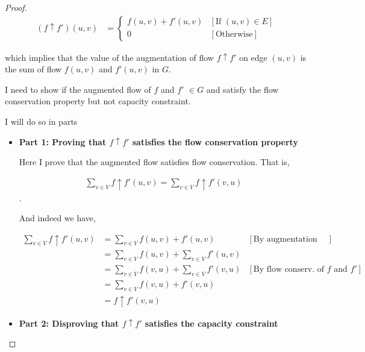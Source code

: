 \documentclass[12pt]{article}
\begin{document}
\begin{enumerate}[1.]
\begin{proof}
    \begin{align}
        (f \uparrow f')(u,v) &= \begin{cases}
            f(u,v) + f'(u,v) & [\text{If $(u,v) \in E$}]\\
            0 & [\text{Otherwise}]
        \end{cases}
    \end{align}

    which implies that the value of the augmentation of flow $f \uparrow f'$
    on edge $(u,v)$ is the sum of flow $f(u,v)$ and $f'(u,v)$ in $G$.

    \bigskip

    I need to show if the augmented flow of $f$ and $f'$ $\in G$ and satisfy the
    flow conservation property but not capacity constraint.

    \bigskip

    I will do so in parts

    \begin{itemize}
        \item \textbf{Part 1: Proving that $f \uparrow f'$ satisfies the flow conservation property}

        \bigskip

        Here I prove that the augmented flow satisfies flow conservation. That is,

        \begin{align}
        \sum\limits_{v \in V} f \uparrow f' (u,v) = \sum\limits_{v \in V} f \uparrow f' (v,u)
        \end{align}.

        \bigskip

        And indeed we have,

        \begin{align}
            \sum\limits_{v \in V} f \uparrow f' (u,v) &= \sum\limits_{v \in V} f(u,v) + f'(u,v) & [\text{By augmentation def.}]\\
            &= \sum\limits_{v \in V} f(u,v) + \sum\limits_{v \in V} f'(u,v)\\
            &= \sum\limits_{v \in V} f(v,u) + \sum\limits_{v \in V} f'(v,u) & [\text{By flow conserv. of $f$ and $f'$}]\\
            &= \sum\limits_{v \in V} f(v,u) + f'(v,u)\\
            &= f \uparrow f' (v,u)
        \end{align}

        \bigskip

        \item \textbf{Part 2: Disproving that $f \uparrow f'$ satisfies the capacity constraint}


\end{itemize}
\end{proof}
\end{enumerate}
\end{document}
